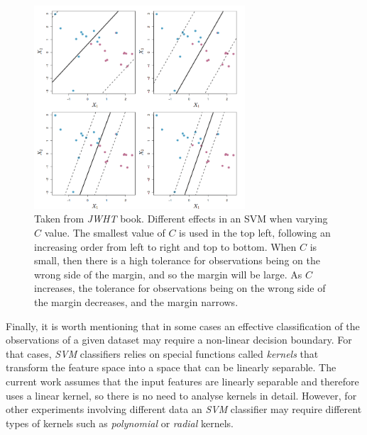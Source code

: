 \begin{figure}[H]
  \centering
  \includegraphics[width=0.7\textwidth]{files/figures/method/c-effects}
  \caption{Taken from \textit{JWHT} \cite{svm_jwht} book. Different effects in an SVM
  when varying $C$ value. The smallest value of $C$ is used in the top left,
  following an increasing order from left to right and top to bottom. When $C$ is small,
  then there is a high tolerance for observations being on the wrong side of the margin,
  and so the margin will be large. As $C$ increases, the tolerance for observations
  being on the wrong side of the margin decreases, and the margin narrows.}
  \label{fig:maxMargin}
\end{figure}

Finally, it is worth mentioning that in some cases an effective classification of the
observations of a given dataset may require a non-linear decision boundary. For that cases,
\textit{SVM} classifiers relies on special functions called \textit{kernels} that transform
the feature space into a space that can be linearly separable. The current work assumes
that the input features are linearly separable and therefore uses a linear kernel,
so there is no need to analyse kernels in detail.
However, for other experiments involving
different data an \textit{SVM} classifier may require different types of kernels
such as \textit{polynomial} or \textit{radial} kernels.